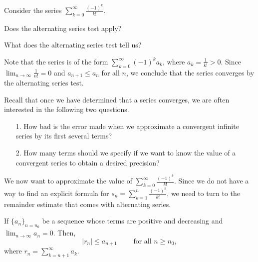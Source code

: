 \documentclass{ximera}
\author{Jim Talamo}
\begin{document}
\begin{exercise}
Consider the series $\sum_{k=0}^{\infty} \frac{(-1)^k}{k!}$.  

Does the alternating series test apply?

\begin{multipleChoice}
\end{multipleChoice}

What does the alternating series test tell us?
\begin{multipleChoice}
\end{multipleChoice}

\begin{feedback}
Note that the series is of the form $\sum_{k=0}^{\infty} (-1)^k a_k$, where $a_k = \frac{1}{k!}>0$.  Since $\lim_{n \to \infty} \frac{1}{n!} =0$ and $a_{n+1} \leq a_n$ for all $n$, we conclude that the series converges by the alternating series test.  
\end{feedback}

\begin{exercise}
Recall that once we have determined that a series converges, we are often interested in the following two questions.

\begin{itemize}
\item[1.] How bad is the error made when we approximate a convergent infinite series by its first several terms?
\item[2.] How many terms should we specify if we want to know the value of a convergent series to obtain a desired precision?
\end{itemize}

We now want to approximate the value of $\sum_{k=0}^{\infty} \frac{(-1)^k}{k!}$.  Since we do not have a way to find an explicit formula for $s_n=\sum_{k=1}^n \frac{(-1)^k}{k!}$, we need to turn to the remainder estimate that comes with alternating series.

\begin{theorem}
If $\{a_n\}_{n=n_0}$ be a sequence whose terms are positive and decreasing and
$\lim_{n\to\infty} a_n=0$. Then,  
\[
\big| r_n \big| \leq a_{n+1} \qquad \textrm{ for all } n \geq n_0,
\]
where $r_n = \sum_{k=n+1}^{\infty} a_k$.
\end{theorem}


\end{exercise}
\end{exercise}
\end{document}
